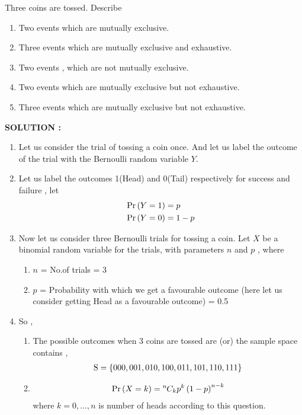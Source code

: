 \documentclass[journal,12pt,twocolumn]{IEEEtran}
\begin{document}
Three coins are tossed. Describe 
\begin{enumerate}[label=(\roman{enumi})]
    \item Two events which are mutually exclusive.
    \item Three events which are mutually exclusive and exhaustive.
    \item Two events , which are not mutually exclusive.
    \item Two events which are mutually exclusive but not exhaustive.
    \item Three events which are mutually exclusive but not exhaustive.
\end{enumerate}

\textbf{SOLUTION :}

\begin{enumerate}
    \item Let us consider the trial of tossing a coin once. And let us label the outcome of the trial with the Bernoulli random variable $Y$.
    \item Let us label the outcomes 1(Head) and 0(Tail) respectively for success and failure , let
    \begin{align}
        \Pr\left(Y=1\right) &= p \\
        \Pr\left(Y=0\right) &= 1-p
    \end{align}
    \item Now let us consider three Bernoulli trials for tossing a coin. Let $X$ be a binomial random variable for the trials, with parameters $n$ and $p$ , where
    \begin{enumerate}
        \item $n$ = No.of trials = 3
        \item $p$ = Probability with which we get a favourable outcome (here let us consider getting Head as a favourable outcome) = 0.5
    \end{enumerate}
    \item So ,
    \begin{enumerate}
        \item The possible outcomes when 3 coins are tossed are (or) the sample space contains ,
        \begin{align}
    	    \text{S} = \left\{000,001,010,100,011,101,110,111\right\}
        \end{align}
        \item 
        \begin{align}
            \Pr\left(X = k\right) = {{}^{n}\mkern-1muC_{k}} p^k\left(1-p\right)^{n-k}
        \end{align}
        where $k= 0,\dots, n$ is number of heads according to this question.
    \end{enumerate}
\end{enumerate}
\end{document}
